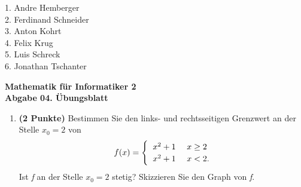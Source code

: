 \documentclass[a4paper,abstract,german]{scrreprt}
\begin{document}
\noindent
{\begin{flushright}
%
%	
1. Andre Hemberger \\
2. Ferdinand Schneider \\
3. Anton Kohrt \\
4. Felix Krug \\
5. Luis Schreck \\
6. Jonathan Tschanter
\end{flushright}}
\begin{center}
	{\textbf  {Mathematik für Informatiker 2}} \\
	{\textbf {Abgabe 04. Übungsblatt}}
\end{center}\vspace{0.3cm}

%
%
\begin{enumerate}

	\item[{1.}]
    \textbf{(2 Punkte)}
    Bestimmen Sie den links- und rechtsseitigen Grenzwert an der Stelle \( x_{0} = 2 \) von
    \[ 
        f(x) = \begin{cases}
            \hspace{0.2cm} x^2 + 1 & \text{ } x \geq 2 \\
            \hspace{0.2cm} x^2 + 1 & \text{ } x < 2.
        \end{cases} 
    \]
    Ist \textit{f} an der Stelle \(x_{0} = 2\) stetig? Skizzieren Sie den Graph von \textit{f}.
	

\end{enumerate}
\end{document}
